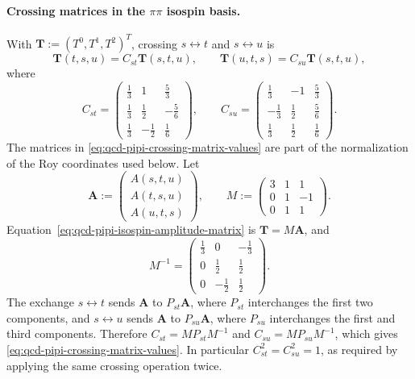 \paragraph{Crossing matrices in the \(\pi\pi\) isospin basis.}
With \(\mathbf T:=(T^0,T^1,T^2)^T\), crossing \(s\leftrightarrow t\) and
\(s\leftrightarrow u\) is
\begin{equation}
  \mathbf T(t,s,u)=C_{st}\mathbf T(s,t,u),
  \qquad
  \mathbf T(u,t,s)=C_{su}\mathbf T(s,t,u),
  \label{eq:qcd-pipi-crossing-matrices}
\end{equation}
where
\begin{equation}
  C_{st}=
  \begin{pmatrix}
    \frac13&1&\frac53\\
    \frac13&\frac12&-\frac56\\
    \frac13&-\frac12&\frac16
  \end{pmatrix},
  \qquad
  C_{su}=
  \begin{pmatrix}
    \frac13&-1&\frac53\\
    -\frac13&\frac12&\frac56\\
    \frac13&\frac12&\frac16
  \end{pmatrix}.
  \label{eq:qcd-pipi-crossing-matrix-values}
\end{equation}
The matrices in \eqref{eq:qcd-pipi-crossing-matrix-values} are part of the
normalization of the Roy coordinates used below.
Let
\[
  \mathbf A:=
  \begin{pmatrix}
    A(s,t,u)\\ A(t,s,u)\\ A(u,t,s)
  \end{pmatrix},
  \qquad
  M:=
  \begin{pmatrix}
    3&1&1\\
    0&1&-1\\
    0&1&1
  \end{pmatrix}.
\]
Equation~\eqref{eq:qcd-pipi-isospin-amplitude-matrix} is
\(\mathbf T=M\mathbf A\), and
\[
  M^{-1}=
  \begin{pmatrix}
    \frac13&0&-\frac13\\
    0&\frac12&\frac12\\
    0&-\frac12&\frac12
  \end{pmatrix}.
\]
The exchange \(s\leftrightarrow t\) sends
\(\mathbf A\) to \(P_{st}\mathbf A\), where \(P_{st}\) interchanges the first
two components, and \(s\leftrightarrow u\) sends \(\mathbf A\) to
\(P_{su}\mathbf A\), where \(P_{su}\) interchanges the first and third
components.  Therefore \(C_{st}=MP_{st}M^{-1}\) and
\(C_{su}=MP_{su}M^{-1}\), which gives
\eqref{eq:qcd-pipi-crossing-matrix-values}.  In particular
\(C_{st}^2=C_{su}^2=1\), as required by applying the same crossing operation
twice.


